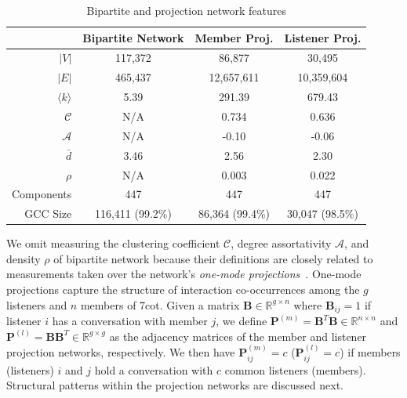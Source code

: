 \begin{table}
\setlength\extrarowheight{0.5pt}
\begin{tabular}{r| c | c | c}
 & Bipartite Network & Member Proj. & Listener Proj. \\
 \hline
 $|V|$ & 117,372 & 86,877 & 30,495 \\
 $|E|$ & 465,437 & 12,657,611 & 10,359,604 \\
 $\langle k \rangle$ & 5.39 & 291.39 & 679.43 \\
 $\mathcal{C}$ & N/A & 0.734 & 0.636 \\ %
 $\mathcal{A}$ & N/A & -0.10 & -0.06 \\
 $\bar{d}$ & 3.46 & 2.56 & 2.30 \\
 $\rho$ & N/A & 0.003 & 0.022 \\ %
 Components & 447 & 447 & 447 \\
 GCC Size & 116,411 (99.2\%) & 86,364 (99.4\%) & 30,047 (98.5\%) \\
 \end{tabular}
 \caption{Bipartite and projection network features}

\label{tab:proj}
\end{table}

We omit measuring the clustering coefficient $\mathcal{C}$, degree
assortativity $\mathcal{A}$, and density $\rho$ of bipartite network because their 
definitions are closely related to measurements taken over the network's
{\em one-mode projections}~\cite{guillaume2006bipartite}.
One-mode projections capture the structure of 
interaction co-occurrences among the $g$ listeners and $n$ members
of 7cot.
Given a matrix $\mathbf{B} \in \mathbb{R}^{g \times n}$ where 
$\mathbf{B}_{ij} = 1$ if listener $i$ has a conversation
with member $j$, we define $\mathbf{P}^{(m)} = \mathbf{B}^T\mathbf{B} \in \mathbb{R}^{n \times n}$ and 
$\mathbf{P}^{(l)} = \mathbf{B}\mathbf{B}^T \in \mathbb{R}^{g \times g}$ as the adjacency matrices 
of the member and listener projection networks, respectively. We then have $\mathbf{P}^{(m)}_{ij} = c$ 
($\mathbf{P}^{(l)}_{ij} = c$)
if members (listeners) $i$ and $j$ hold a conversation 
with $c$ common listeners (members). Structural patterns within the
projection networks are discussed next. 

